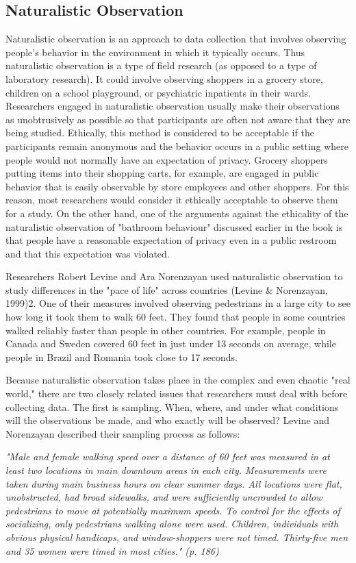 \subsection{Naturalistic Observation}


Naturalistic observation is an approach to data collection that involves observing people's behavior in the environment in which it typically occurs. Thus naturalistic observation is a type of field research (as opposed to a type of laboratory research). It could involve observing shoppers in a grocery store, children on a school playground, or psychiatric inpatients in their wards. Researchers engaged in naturalistic observation usually make their observations as unobtrusively as possible so that participants are often not aware that they are being studied. Ethically, this method is considered to be acceptable if the participants remain anonymous and the behavior occurs in a public setting where people would not normally have an expectation of privacy. Grocery shoppers putting items into their shopping carts, for example, are engaged in public behavior that is easily observable by store employees and other shoppers. For this reason, most researchers would consider it ethically acceptable to observe them for a study. On the other hand, one of the arguments against the ethicality of the naturalistic observation of "bathroom behaviour" discussed earlier in the book is that people have a reasonable expectation of privacy even in a public restroom and that this expectation was violated.


Researchers Robert Levine and Ara Norenzayan used naturalistic observation to study differences in the "pace of life" across countries (Levine \& Norenzayan, 1999)2. One of their measures involved observing pedestrians in a large city to see how long it took them to walk 60 feet. They found that people in some countries walked reliably faster than people in other countries. For example, people in Canada and Sweden covered 60 feet in just under 13 seconds on average, while people in Brazil and Romania took close to 17 seconds.


Because naturalistic observation takes place in the complex and even chaotic "real world," there are two closely related issues that researchers must deal with before collecting data. The first is sampling. When, where, and under what conditions will the observations be made, and who exactly will be observed? Levine and Norenzayan described their sampling process as follows:


\emph{"Male and female walking speed over a distance of 60 feet was measured in at least two locations in main downtown areas in each city. Measurements were taken during main business hours on clear summer days. All locations were flat, unobstructed, had broad sidewalks, and were sufficiently uncrowded to allow pedestrians to move at potentially maximum speeds. To control for the effects of socializing, only pedestrians walking alone were used. Children, individuals with obvious physical handicaps, and window-shoppers were not timed. Thirty-five men and 35 women were timed in most cities." (p. 186)}


